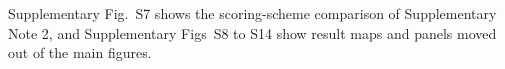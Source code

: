 Supplementary Fig.~S7 shows the scoring-scheme comparison of Supplementary Note 2, and Supplementary Figs~S8 to S14 show result maps and panels moved out of the main figures.%

